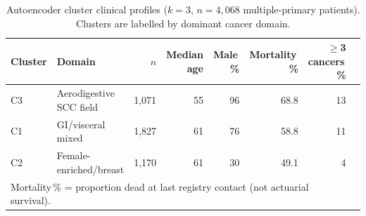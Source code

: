 \documentclass[review,12pt]{elsarticle}
\begin{document}
\clearpage

\begin{table}[H]
  \centering
  \caption{Autoencoder cluster clinical profiles ($k = 3$, $n = 4{,}068$
    multiple-primary patients). Clusters are labelled by dominant cancer domain.}
  \label{tab:clusters}
  \begin{tabular}{llrrrrrr}
    \toprule
    Cluster & Domain & $n$ & Median age & Male\,\% & Mortality\,\% &
    $\geq$3 cancers\,\% \\
    \midrule
    C3 & Aerodigestive SCC field   & 1{,}071 & 55 & 96 & 68.8 & 13 \\
    C1 & GI/visceral mixed         & 1{,}827 & 61 & 76 & 58.8 & 11 \\
    C2 & Female-enriched/breast    & 1{,}170 & 61 & 30 & 49.1 &  4 \\
    \bottomrule
    \multicolumn{7}{l}{\small Mortality\,\% = proportion dead at last registry
      contact (not actuarial survival).}
  \end{tabular}
\end{table}

\clearpage
\end{document}
